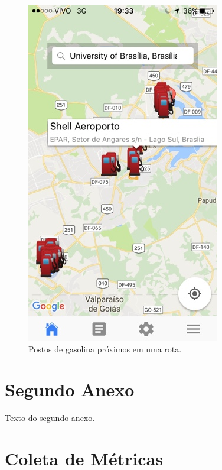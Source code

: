 \begin{anexosenv}
\begin{figure}[H]
    \centering
    \includegraphics[scale=0.5]{figuras/app_5.jpg}
    \caption[Postos de gasolina próximos em uma rota]{Postos de gasolina próximos em uma rota.}
    \label{img:postos_de_gasolina_proximos_em_uma_rota}
\end{figure}

\chapter{Segundo Anexo}

Texto do segundo anexo.
\chapter{Coleta de Métricas}
\label{chap:metricas}

\end{anexosenv}

